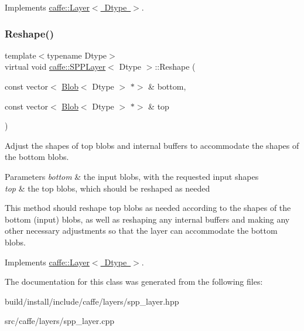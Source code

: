 Implements \mbox{\hyperlink{classcaffe_1_1_layer_a7fe981e8af8d93d587acf2a952be563d}{caffe\+::\+Layer$<$ Dtype $>$}}.

\mbox{\label{classcaffe_1_1_s_p_p_layer_ab23015d8d27fccab684de17b7c6d4e28}} 
\subsubsection{\texorpdfstring{Reshape()}{Reshape()}\hspace{0.1cm}{\footnotesize\ttfamily [2/2]}}
{\footnotesize\ttfamily template$<$typename Dtype$>$ \\
virtual void \mbox{\hyperlink{classcaffe_1_1_s_p_p_layer}{caffe\+::\+S\+P\+P\+Layer}}$<$ Dtype $>$\+::Reshape (\begin{DoxyParamCaption}\item[{const vector$<$ \mbox{\hyperlink{classcaffe_1_1_blob}{Blob}}$<$ Dtype $>$ $\ast$$>$ \&}]{bottom,  }\item[{const vector$<$ \mbox{\hyperlink{classcaffe_1_1_blob}{Blob}}$<$ Dtype $>$ $\ast$$>$ \&}]{top }\end{DoxyParamCaption})\hspace{0.3cm}{\ttfamily [virtual]}}



Adjust the shapes of top blobs and internal buffers to accommodate the shapes of the bottom blobs. 


\begin{DoxyParams}{Parameters}
{\em bottom} & the input blobs, with the requested input shapes \\
\hline
{\em top} & the top blobs, which should be reshaped as needed\\
\hline
\end{DoxyParams}
This method should reshape top blobs as needed according to the shapes of the bottom (input) blobs, as well as reshaping any internal buffers and making any other necessary adjustments so that the layer can accommodate the bottom blobs. 

Implements \mbox{\hyperlink{classcaffe_1_1_layer_a7fe981e8af8d93d587acf2a952be563d}{caffe\+::\+Layer$<$ Dtype $>$}}.



The documentation for this class was generated from the following files\+:\begin{DoxyCompactItemize}
\item 
build/install/include/caffe/layers/spp\+\_\+layer.\+hpp\item 
src/caffe/layers/spp\+\_\+layer.\+cpp\end{DoxyCompactItemize}
